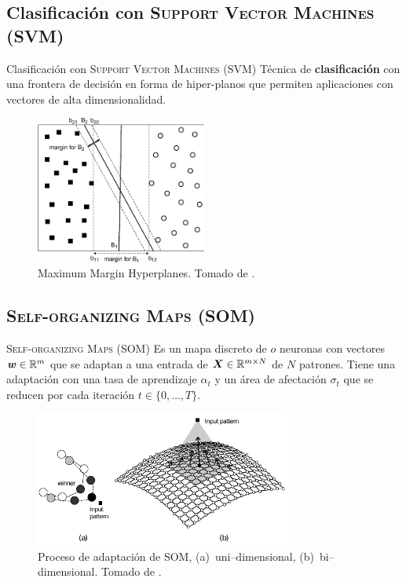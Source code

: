 \documentclass[10pt]{beamer}
\begin{document}
\subsection{Clasificación con \textsc{Support Vector Machines (SVM)}}
\begin{frame}{Clasificación con \textsc{Support Vector Machines (SVM)}}
  Técnica de \textbf{clasificación} con una frontera de decisión en forma de hiper-planos que permiten aplicaciones con vectores de alta dimensionalidad.
  \begin{figure}
    \centering
    \includegraphics[width=0.5\textwidth]{Images/svm-hyperplanes.pdf}
    \caption[Maximum Margin Hyperplanes]{Maximum Margin Hyperplanes. Tomado de \cite{tan2005introduction}.}
    \label{fig:svm-hyperplanes}
  \end{figure}
\end{frame}

\subsection{\textsc{Self-organizing Maps (SOM)}}
\begin{frame}{\textsc{Self-organizing Maps (SOM)}}
  Es un mapa discreto de $o$ neuronas con vectores ${\bm{w}} \in \mathbb{R}^m$ que se adaptan a una entrada de ${\bm{X}} \in \mathbb{R}^{m \times N}$ de $N$ patrones. Tiene una adaptación con una tasa de aprendizaje $\alpha_t$ y un área de afectación $\sigma_t$ que se reducen por cada iteración $t \in \{0, \ldots, T\}$.
  \begin{figure}
    \centering
    \includegraphics[width=0.75\textwidth]{Images/som-adaptive-proc.pdf}
    \caption[Proceso de adaptación de \textsc{SOM}]{Proceso de adaptación de \textsc{SOM}, (a)~uni--dimensional, (b)~bi--dimensional. Tomado de \cite{de2006fundamentals}.}
    \label{fig:som-adap-proc}
  \end{figure}
\end{frame}
\end{document}
